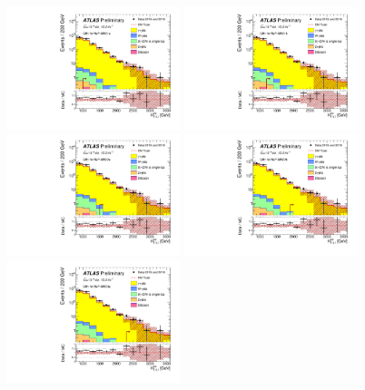 \begin{figure}[tbp]
\begin{center}
\includegraphics[width=0.45\textwidth]{figures/ATLAS-CONF-2016-078_INT/N-1Plots/AtlasStyle/Preliminary/CRY_SRJigsawSRG1a_LastCut_CRY_minusone}
\includegraphics[width=0.45\textwidth]{figures/ATLAS-CONF-2016-078_INT/N-1Plots/AtlasStyle/Preliminary/CRY_SRJigsawSRG1b_LastCut_CRY_minusone}
\includegraphics[width=0.45\textwidth]{figures/ATLAS-CONF-2016-078_INT/N-1Plots/AtlasStyle/Preliminary/CRY_SRJigsawSRG2a_LastCut_CRY_minusone}
\includegraphics[width=0.45\textwidth]{figures/ATLAS-CONF-2016-078_INT/N-1Plots/AtlasStyle/Preliminary/CRY_SRJigsawSRG2b_LastCut_CRY_minusone}
\includegraphics[width=0.45\textwidth]{figures/ATLAS-CONF-2016-078_INT/N-1Plots/AtlasStyle/Preliminary/CRY_SRJigsawSRG3a_LastCut_CRY_minusone}

\end{center}
\end{figure}

